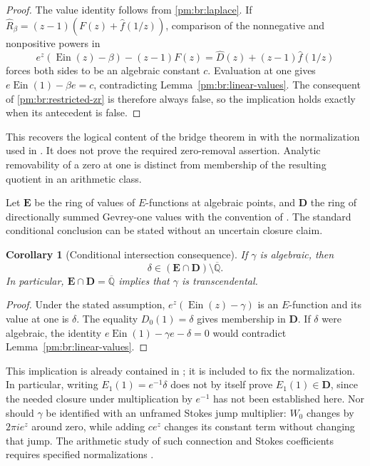 \documentclass[11pt,a4paper]{article}
\newtheorem{corollary}[theorem]{Corollary}
\theoremstyle{definition}
\theoremstyle{remark}
\numberwithin{equation}{section}
\begin{document}
\begin{proof}
The value identity follows from \eqref{pm:br:laplace}.  If
\(\widehat R_\beta=(z-1)(F(z)+\widehat f(1/z))\), comparison of the
nonnegative and nonpositive powers in
\[
 e^z(\operatorname{Ein}(z)-\beta)-(z-1)F(z)
       =\widehat D(z)+(z-1)\widehat f(1/z)
\]
forces both sides to be an algebraic constant \(c\).  Evaluation at one
gives \(e\operatorname{Ein}(1)-\beta e=c\), contradicting
Lemma~\ref{pm:br:linear-values}.  The consequent of
\eqref{pm:br:restricted-zr} is therefore always false, so the implication
holds exactly when its antecedent is false.
\end{proof}

This recovers the logical content of the bridge theorem in
\cite{pm:KEIO001} with the normalization used in \cite{pm:KEIO002}.  It
does not prove the required zero-removal assertion.  Analytic removability
of a zero at one is distinct from membership of the resulting quotient
in an arithmetic class.

Let \(\mathbf E\) be the ring of values of \(E\)-functions at algebraic
points, and \(\mathbf D\) the ring of directionally summed Gevrey-one
values with the convention of \cite{pm:FischlerRivoal2024}.  The standard
conditional conclusion can be stated without an uncertain closure claim.

\begin{corollary}[Conditional intersection consequence]
\label{pm:br:intersection}
If \(\gamma\) is algebraic, then
\[
 \delta\in(\mathbf E\cap\mathbf D)\setminus\overline{\mathbb Q}.
\]
In particular, \(\mathbf E\cap\mathbf D=\overline{\mathbb Q}\)
implies that \(\gamma\) is transcendental.
\end{corollary}

\begin{proof}
Under the stated assumption, \(e^z(\operatorname{Ein}(z)-\gamma)\)
is an \(E\)-function and its value at one is \(\delta\).
The equality \(D_0(1)=\delta\) gives membership in \(\mathbf D\).
If \(\delta\) were algebraic, the identity
\(e\operatorname{Ein}(1)-\gamma e-\delta=0\) would contradict
Lemma~\ref{pm:br:linear-values}.
\end{proof}

This implication is already contained in
\cite[Theorem~2]{pm:FischlerRivoal2024}; it is included to fix the
normalization.  In particular, writing \(E_1(1)=e^{-1}\delta\) does
not by itself prove \(E_1(1)\in\mathbf D\), since the needed closure
under multiplication by \(e^{-1}\) has not been established here.
Nor should \(\gamma\) be identified with an unframed Stokes jump
multiplier: \(W_0\) changes by \(2\pi i e^z\) around zero, while adding
\(c e^z\) changes its constant term without changing that jump.
The arithmetic study of such connection and Stokes coefficients requires
specified normalizations \cite{pm:FischlerRivoal2016}.
\end{document}
